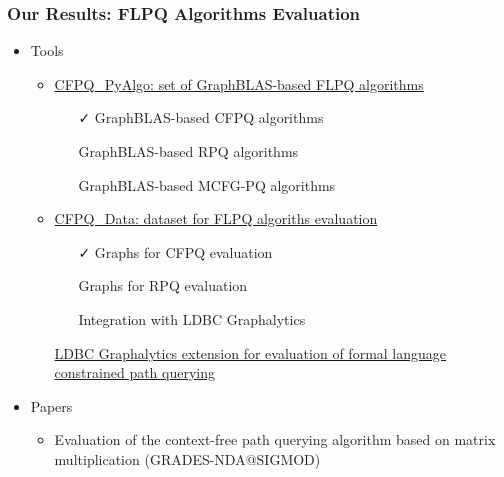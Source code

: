 \documentclass[xcolor=table,aspectratio=169]{beamer}
\begin{document}
\begin{frame}[fragile]
  \frametitle{Our Results: FLPQ Algorithms Evaluation}
    \begin{itemize}
      \item Tools
      \begin{itemize}
        \item \href{https://github.com/JetBrains-Research/CFPQ_PyAlgo}{CFPQ\_PyAlgo: set of GraphBLAS-based FLPQ algorithms}
        \begin{itemize}  
          \item[\faCheck] GraphBLAS-based CFPQ algorithms
          \item[\faGears] GraphBLAS-based RPQ algorithms
          \item[\faGears] GraphBLAS-based MCFG-PQ algorithms
        \end{itemize} 
        \pause
        \item \href{https://github.com/JetBrains-Research/CFPQ_Data}{CFPQ\_Data: dataset for FLPQ algoriths evaluation}
        \begin{itemize}  
          \item[\faCheck] Graphs for CFPQ evaluation
          \item[\faGears] Graphs for RPQ evaluation
          \item[\faGears] Integration with LDBC Graphalytics
        \end{itemize} 
        \pause
        \item[\faGears] \href{https://github.com/JetBrains-Research/ldbc_graphalytics}{LDBC Graphalytics extension for evaluation of formal language constrained path querying}            
      \end{itemize}
      \pause
      \item Papers 
      \begin{itemize}        
        \item Evaluation of the context-free path querying algorithm based on matrix multiplication (GRADES-NDA@SIGMOD)
      \end{itemize} 
    \end{itemize}
\end{frame}
\end{document}
